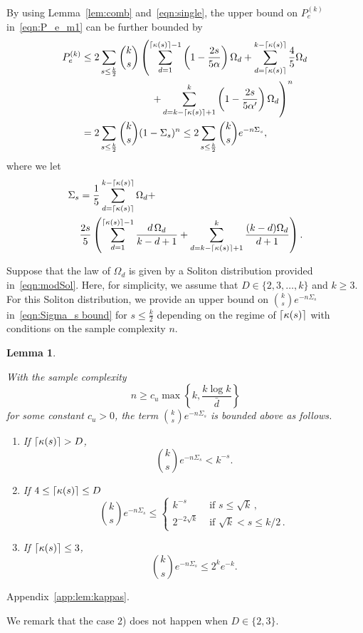 \documentclass[11pt,onecolumn]{IEEEtran}
\newtheorem{lem}{Lemma}
\newcommand{\beq}{\begin{equation}}
\newcommand{\eeq}{\end{equation}}
\DeclarePairedDelimiter\ceil{\lceil}{\rceil}
\begin{document}
By using Lemma~\ref{lem:comb} and~\eqref{eqn:single}, the upper bound on $P_e^{(k)}$ in~\eqref{eqn:P_e_m1} can be further bounded by
\beq \begin{split} \label{eqn:Sigma_s bound}
P_e^{(k)} &\leq 2\sum_{s \leq \frac{k}{2}} { k \choose s}\left(\sum_{d=1}^{\ceil*{\kappa(s)}-1} \left(1- \frac{2s}{5\alpha}\right) \Omega_d+ \sum_{d=\ceil*{\kappa(s)}}^{k-\ceil*{\kappa(s)}} \frac{4}{5}\Omega_d\right.\\
&\left. \qquad\qquad\qquad\quad + \sum_{d=k-\ceil*{\kappa(s)}+1}^{k} \left(1- \frac{2s}{5\alpha'}\right) \Omega_d \right)^n \\
&= 2\sum_{s \leq \frac{k}{2}} { k \choose s} (1-\Sigma_s)^n \leq 2\sum_{s \leq \frac{k}{2}} { k \choose s} e^{-n \Sigma_s},
\end{split} \eeq
where we let
\beq\label{eqn:sig_s}
\begin{split}
\Sigma_s &= \frac{1}{5} \sum_{d=\ceil*{\kappa(s)}}^{k-\ceil*{\kappa(s)}} \Omega_d + \\
&\frac{2s}{5} \left( \sum_{d=1}^{\ceil*{\kappa(s)}-1} \frac{d\,\Omega_d}{k-d+1} + \sum_{d=k-\ceil*{\kappa(s)}+1}^{k} \frac{(k-d)\Omega_d}{d+1} \right).
\end{split}
\eeq

Suppose that the law of $\Omega_d$ is given by a Soliton distribution provided in~\eqref{eqn:modSol}.
Here, for simplicity, we assume that $D\in\{2,3,\dots,k\}$ and $k\geq 3$.
For this Soliton distribution, we provide an upper bound on ${k \choose s}e^{-n\Sigma_s}$ in~\eqref{eqn:Sigma_s bound} for $s \leq \frac{k}{2}$ depending on the regime of $\ceil*{\kappa(s)}$ with conditions on the sample complexity $n$.
\begin{lem}\label{lem:kappas}
{\it
With the sample complexity
\beq\label{eqn:sam_suff1}
n\geq c_u\max\left\{k,\frac{k\log k}{\bar{d}}\right\}
\eeq
for some constant $c_u>0$, the term ${k \choose s}e^{-n\Sigma_s}$ is bounded above as follows. 
\begin{enumerate}
\item If $\ceil*{\kappa(s)} > D$,
\beq
\binom{k}{s} e^{-n\Sigma_s} <  k^{-s}.
\eeq
\item If $4 \leq \ceil*{\kappa(s)} \leq D$
\beq
\binom{k}{s} e^{-n\Sigma_s}  \leq
	\begin{cases}
	k^{-s} & \text{ if } s \leq \sqrt k \,, \\
	2^{-2\sqrt k} &\text{ if } \sqrt k < s \leq k/2 \,.
	\end{cases}
\eeq
\item If $\ceil*{\kappa(s)} \leq 3$,
\beq
\binom{k}{s} e^{-n\Sigma_s} \leq 2^k e^{-k}.
\eeq
\end{enumerate}
}
\end{lem}
\begin{IEEEproof}
Appendix~\ref{app:lem:kappas}.
\end{IEEEproof}
We remark that the case 2) does not happen when $D \in \{ 2, 3\}$. 
\end{document}
